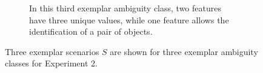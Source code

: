 \documentclass[10pt,a4paper]{article}
\begin{document}
\begin{figure}[!htb]
\begin{subfigure}{\linewidth}
\begin{subfigure}[t]{0.3\linewidth}
	\end{subfigure}
	\caption{In this third exemplar ambiguity class, two features have three unique values, while one feature allows the identification of a pair of objects.}
	\end{subfigure}
	\caption{Three exemplar scenarios $S$ are shown for three exemplar ambiguity classes for Experiment 2.} 
	\label{fig:ambiguity-classes-exp2}
\end{figure}
\end{document}
